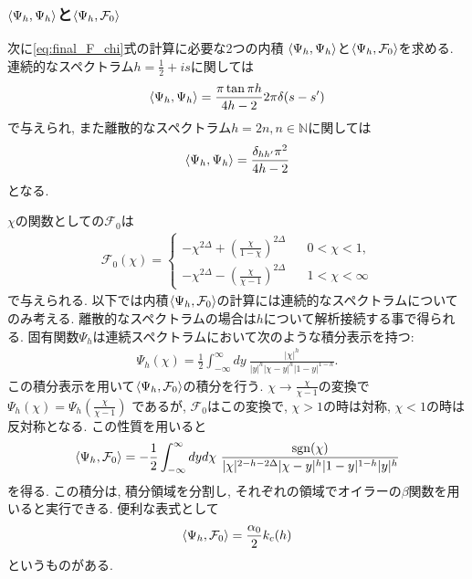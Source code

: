 \subsubsection{$\langle \Psi_h, \Psi_h \rangle$と$\langle \Psi_h, \mathcal{F}_0 \rangle$}

次に\eqref{eq:final_F_chi}式の計算に必要な2つの内積
$\langle \Psi_h, \Psi_h \rangle$と$\langle \Psi_h, \mathcal{F}_0 \rangle$を求める. 
連続的なスペクトラム$h = \frac{1}{2} + is$に関しては
\begin{align}
	\langle \Psi_h, \Psi_h \rangle = \frac{\pi\tan\pi h}{4h-2}2\pi\delta(s - s')
\end{align}
で与えられ, また離散的なスペクトラム$h = 2n, n\in\mathbb{N}$に関しては
\begin{align}
	\langle \Psi_h, \Psi_h \rangle = \frac{\delta_{hh'}\pi^2}{4h-2}
\end{align}
となる. 

$\chi$の関数としての$\mathcal{F}_0$は
\begin{align}
	\mathcal{F}_0(\chi) = \left\{
	\begin{array}{l}
		-\chi^{2\Delta} + \left(\frac{\chi}{1 - \chi}\right)^{2\Delta}
		\hspace{20pt}0 < \chi < 1,\\
		-\chi^{2\Delta} - \left(\frac{\chi}{\chi - 1}\right)^{2\Delta}
		\hspace{20pt}1 < \chi < \infty
	\end{array}\right.
\end{align}
で与えられる. 
以下では内積$\langle \Psi_h, \mathcal{F}_0 \rangle$の計算には連続的なスペクトラムについてのみ考える. 
離散的なスペクトラムの場合は$h$について解析接続する事で得られる. 
固有関数$\Psi_h$は連続スペクトラムにおいて次のような積分表示を持つ:
\begin{align}
	\Psi_h(\chi) = \frac{1}{2}\int_{-\infty}^{\infty}dy\ 
	\frac{|\chi|^h}{|y|^h|\chi - y|^h|1 - y|^{1-h}}.
\end{align}
この積分表示を用いて$\langle \Psi_h, \mathcal{F}_0 \rangle$の積分を行う. 
$\chi\to\frac{\chi}{\chi-1}$の変換で$\Psi_h(\chi) = \Psi_h\left(\frac{\chi}{\chi-1}\right)$
であるが, $\mathcal{F}_0$はこの変換で, $\chi > 1$の時は対称, $\chi < 1$の時は反対称となる. 
この性質を用いると
\begin{align}
	\innerprod{\Psi_h}{\mathcal{F}_0}
	= -\frac{1}{2}\int_{-\infty}^{\infty}dyd\chi\ 
	\frac{\sgn(\chi)}{|\chi|^{2-h-2\Delta}|\chi-y|^h|1-y|^{1-h}|y|^h}
\end{align}
を得る. 
この積分は, 積分領域を分割し, それぞれの領域でオイラーの$\beta$関数を用いると実行できる. 
便利な表式として
\begin{align}
	\langle \Psi_h, \mathcal{F}_0 \rangle = \frac{\alpha_0}{2}k_c(h)
\end{align}
というものがある. 

